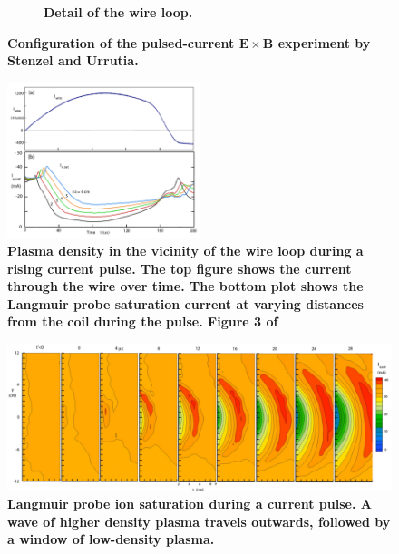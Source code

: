 \documentclass[twocolumn]{article}
\begin{document}
\begin{figure}[!ht]
\begin{subfigure}{0.5\textwidth}
					\caption{\textbf{Detail of the wire loop.}}
					\label{fig:Stenzel_ExperimentConfig2}
				\end{subfigure}%
				\caption{\textbf{Configuration of the pulsed-current $\mathbf{E\times B}$ experiment by Stenzel and Urrutia.}\cite{stenzel_new_2013}}
				\label{fig:Stenzel_ExperimentConfig}
			\end{figure}
			
				\begin{figure}[!th]
					\centering
					\includegraphics[width=0.5\textwidth]{Images/Stenzel_ExperimentCurrentPlots}
					\caption{\textbf{Plasma density in the vicinity of the wire loop during a rising current pulse. The top figure shows the current through the wire over time. The bottom plot shows the Langmuir probe saturation current at varying distances from the coil during the pulse. Figure 3 of \cite{stenzel_new_2013}}}
					\label{fig:Stenzel_ExperimentCurrentPlots}
				\end{figure}
				
				\begin{figure}[!ht]
					\centering
					\includegraphics[width=1.0\linewidth]{Images/Stenzel_ExperimentContourPlot}
					\caption{\textbf{Langmuir probe ion saturation during a current pulse. A wave of higher density plasma travels outwards, followed by a window of low-density plasma.\cite{stenzel_new_2013}}}
					\label{fig:Stenzel_ExperimentContourPlot}
				\end{figure}
			
\end{document}
